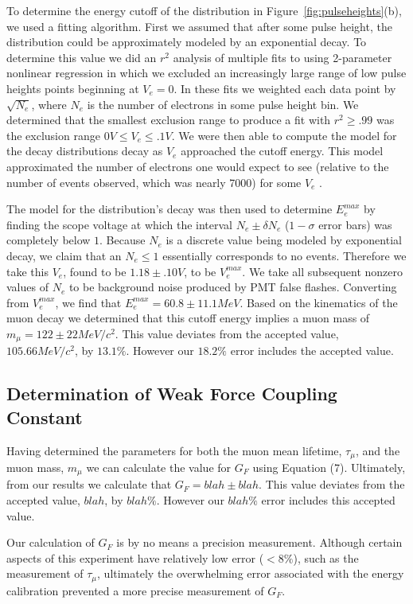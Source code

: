 To determine the energy cutoff of the distribution in Figure~\ref{fig:pulseheights}(b), we
used a fitting algorithm.  First we assumed that after some pulse
height, the distribution could be approximately modeled by an
exponential decay.  To determine this value we did an $r^{2}$ analysis
of multiple fits to using 2-parameter nonlinear regression in which we
excluded an increasingly large range of low pulse heights points
beginning at $V_{e}=0$.  In these fits we weighted each data point by
$\sqrt{N_{e}}$, where $N_{e}$ is the number of electrons in some pulse
height bin.  We determined that the smallest exclusion range to
produce a fit with $r^{2}\geq.99$ was the exclusion range $0 V \leq
V_{e}\leq .1 V$.  We were then able to compute the model for the
decay distributions decay as $V_{e}$ approached the cutoff energy.
This model approximated the number of electrons one would expect to
see (relative to the number of events observed, which was nearly 7000)
for some $V_{e}$ .

The model for the distribution's decay was then used to determine
$E_{e}^{max}$ by finding the scope voltage at which the interval
$N_{e}\pm \delta N_{e}$ ($1-\sigma$ error bars) was completely below
$1$.  Because $N_{e}$ is a discrete value being modeled by exponential
decay, we claim that an $N_{e} \leq 1$ essentially corresponds to no
events.  Therefore we take this $V_{e}$, found to be $1.18\pm.10 V$,
to be $V_{e}^{max}$. We take all subsequent nonzero values of $N_{e}$
to be background noise produced by PMT false flashes.  Converting from
$V_{e}^{max}$, we find that $E_{e}^{max}=60.8 \pm 11.1 MeV$.  Based on
the kinematics of the muon decay we determined that this cutoff energy
implies a muon mass of $m_{\mu} = 122 \pm 22 MeV/c^{2}$.  This
value deviates from the accepted value, $105.66 MeV/c^{2}$, by $13.1\%$.
However our $18.2\%$ error includes the accepted value.

\subsection{Determination of Weak Force Coupling Constant}

Having determined the parameters for both the muon mean lifetime, $\tau_{\mu}$, and the muon mass, $m_{\mu}$ we can calculate the value for $G_{F}$ using Equation (7). Ultimately, from our results we calculate that $G_{F}=blah \pm blah$.  This value deviates from the accepted value, $blah$, by $blah\%$. However our $blah\%$ error includes this accepted value.

Our calculation of $G_F$ is by no means a precision measurement.  Although certain aspects of this experiment have relatively low error ($<8\%$), such as the measurement of $\tau_{\mu}$, ultimately the overwhelming error associated with the energy calibration prevented a more precise measurement of $G_F$.
